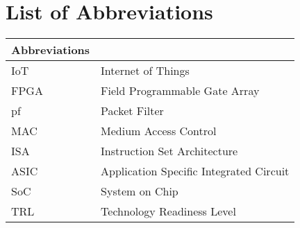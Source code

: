 


\clearpage
\pagestyle{headings}

\chapter[List of Abbreviations ]{List of Abbreviations}


\begin{center}
	\small
	\begin{longtable}{ll}
	\toprule
	Abbreviations & {} \\
	\bottomrule
	
	IoT				& Internet of Things \\
	FPGA				& Field Programmable Gate Array \\
	pf				& Packet Filter \\
	MAC				& Medium Access Control \\
	ISA				& Instruction Set Architecture \\
	ASIC				& Application Specific Integrated Circuit \\
	SoC				& System on Chip \\
	TRL				& Technology Readiness Level \\
	\hline
	\end{longtable}
\end{center}

\clearpage

\tableofcontents
	\clearpage
\listoffigures
\listoftables


